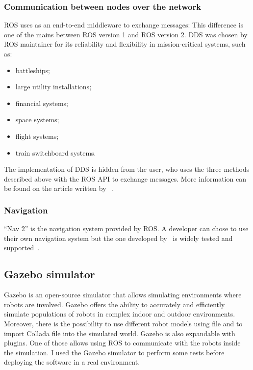 \documentclass[../thesis.tex]{subfiles}
\begin{document}
\subsubsection{Communication between nodes over the network}
\gls{ROS} uses  as an end-to-end middleware to exchange messages:  This difference is one of the mains between \gls{ROS} version 1 and \gls{ROS} version 2. \gls{DDS} was chosen by \gls{ROS} maintainer for its reliability and flexibility in mission-critical systems, such as:
\begin{itemize}
    \item battleships;
    \item large utility installations;
    \item financial systems;
    \item space systems;
    \item flight systems;
    \item train switchboard systems.
\end{itemize}
The implementation of \gls{DDS} is hidden from the user, who uses the three methods described above with the \gls{ROS} API to exchange messages. More information can be found on the article written by \citeauthor{site:ros_dds}~\cite{site:ros_dds}.

\subsubsection{Navigation}
``Nav 2'' is the navigation system provided by \gls{ROS}. A developer can chose to use their own navigation system but the one developed by~\citeauthor{paper:navigation2} is widely tested and supported~\cite{paper:navigation2}. 

\subsection{Gazebo simulator}
Gazebo is an open-source simulator that allows simulating environments where robots are involved. Gazebo offers the ability to accurately and efficiently simulate populations of robots in complex indoor and outdoor environments. Moreover, there is the possibility to use different robot models using  file and to import Collada file into the simulated world. Gazebo is also expandable with plugins. One of those allows using \acrshort{ROS} to communicate with the robots inside the simulation. I used the Gazebo simulator to perform some tests before deploying the software in a real environment. 
\end{document}
